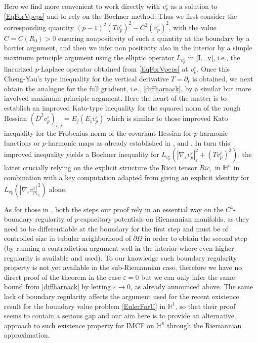\documentclass[10pt]{amsart}
\numberwithin{equation}{section}
\theoremstyle{definition}
\newcommand{\He}{\mathbb{H}}
\begin{document}
Here we find more convenient to work directly with $v^\varepsilon_p$ as a solution to \eqref{EqForVpeps} and to rely on the Bochner method. Thus we first consider the corresponding quantity $ (p-1)^2(T v^\varepsilon_p)^2-C^2 (v^\varepsilon_p)^2$, with the value $C=C(R_0)>0$ ensuring nonpositivity of such a quantity at the boundary by a barrier argument, and then we infer non positivity also in the interior by a simple maximum principle argument using  the elliptic operator $L_{v^\varepsilon_p}$ in \eqref{L_v}, i.e., the linearized $p$-Laplace operator obtained from \eqref{EqForVpeps} at $v^{\varepsilon}_{p}$.  
Once this Cheng-Yau's type inequality for the vertical derivative $T=\partial_t$ is obtained, we next obtain the analugue for the full gradient, i.e., \eqref{diffharnack}, by a similar but more involved maximum principle argument. Here the heart of the matter is to establish an improved Kato-type inequality for the squared norm of the rough Hessian $\left(\overline{D}^2 v^\varepsilon_p \right)_{i,j}=E_j (E_i v^\varepsilon_p)$ which is similar to those improved Kato inequality for the Frobenius norm of the covariant Hessian for $p$-harmonic functions or $p$-harmonic maps as already established in \cite{Naber}, \cite{ChChWei} and \cite{MaMi}. In turn this improved inequality yields a Bochner inequality for $L_{v^\varepsilon_p} \left(|\nabla_\varepsilon v^\varepsilon_p|_{\varepsilon}^2 +(Tv^\varepsilon_p)^2\right)$, the latter crucially relying  on the explicit structure the Ricci tensor $Ric_\varepsilon$ in $\He^n$ in combination with a key computation adapted from \cite{KotschwarNi} giving an explicit identity for $L_{v^\varepsilon_p} \left(|\nabla_\varepsilon v^\varepsilon_p|_{\varepsilon}^2 \right)$ alone.
 
 As for those in \cite{Moser}, both the steps our proof rely in an essential way on the $C^1$-boundary regularity of $p$-capacitary potentials on Riemannian manifolds, as they need to be differentiable at the boundary for the first step and must be of controlled size in tubular neighborhood of $\partial \Omega$ in order to obtain the second step (by running a contradiction argument well in the interior where even higher regularity is available and used). To our knowledge such boundary regularity property is not yet available in the sub-Riemannian case, therefore we have no direct proof of the theorem in the case $\varepsilon=0$ but we can only infer the same bound from \eqref{diffharnack} by letting $\varepsilon \to 0$, as already announced above. The same lack of boundary regularity affects the argument used for the recent existence result \cite[Proposition 5.3]{CuiZhao} for the boundary value problem \eqref{EulerForU} in $\He^1$, so that their proof seems to contain a serious gap and our aim here is to provide an alternative approach to such existence property for IMCF on $\mathbb{H}^n$ through the Riemannian approximation.    
\end{document}
